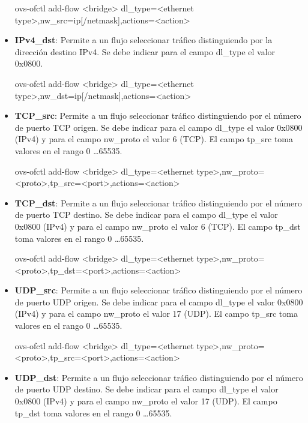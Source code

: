 \begin{itemize}
\begin{center}
ovs-ofctl add-flow <bridge> dl\_type=<ethernet type>,nw\_src=ip[/netmask],actions=<action>
\end{center}

\item \textbf{IPv4\_dst}: Permite a un flujo seleccionar tr\'afico distinguiendo por la dirección destino IPv4. Se debe indicar para el campo dl\_type el valor 0x0800.  

\begin{center}
ovs-ofctl add-flow <bridge> dl\_type=<ethernet type>,nw\_dst=ip[/netmask],actions=<action>
\end{center}
 
\item \textbf{TCP\_src}: Permite a un flujo seleccionar tr\'afico distinguiendo por el n\'umero de puerto TCP origen. Se debe indicar para el campo dl\_type el valor 0x0800 (IPv4) y para el campo nw\_proto el valor 6 (TCP). El campo tp\_src toma valores en el rango 0 \dots 65535.

\begin{center}
ovs-ofctl add-flow <bridge> dl\_type=<ethernet type>,nw\_proto=<proto>,tp\_src=<port>,actions=<action>
\end{center}

\item \textbf{TCP\_dst}: Permite a un flujo seleccionar tr\'afico distinguiendo por el n\'umero de puerto TCP destino. Se debe indicar para el campo dl\_type el valor 0x0800 (IPv4) y para el campo nw\_proto el valor 6 (TCP). El campo tp\_dst toma valores en el rango 0 \dots 65535.

\begin{center}
ovs-ofctl add-flow <bridge> dl\_type=<ethernet type>,nw\_proto=<proto>,tp\_dst=<port>,actions=<action>
\end{center}

\item \textbf{UDP\_src}: Permite a un flujo seleccionar tr\'afico distinguiendo por el n\'umero de puerto UDP origen. Se debe indicar para el campo dl\_type el valor 0x0800 (IPv4) y para el campo nw\_proto el valor 17 (UDP). El campo tp\_src toma valores en el rango 0 \dots 65535.

\begin{center}
ovs-ofctl add-flow <bridge> dl\_type=<ethernet type>,nw\_proto=<proto>,tp\_src=<port>,actions=<action>
\end{center}

\item \textbf{UDP\_dst}: Permite a un flujo seleccionar tr\'afico distinguiendo por el n\'umero de puerto UDP destino. Se debe indicar para el campo dl\_type el valor 0x0800 (IPv4) y para el campo nw\_proto el valor 17 (UDP). El campo tp\_dst toma valores en el rango 0 \dots 65535.


\end{itemize}
